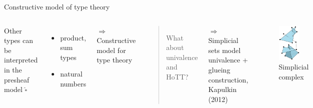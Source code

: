 \documentclass[english,draft]{beamer}
\begin{document}
\begin{frame}{Constructive model of type theory}
 


 \begin{columns}[c]
         Other types can be interpreted in the presheaf model $\widehat{\square}$
 
 \begin{itemize}
  \item product, sum types
  \item natural numbers
 \end{itemize}
        
         $\Rightarrow$ Constructive model for type theory
 
        \begin{quotation}
        What about univalence and HoTT?
        \end{quotation}
        
        \pause
        
        $\Rightarrow$ Simplicial sets model univalence + glueing construction, Kapulkin (2012)
        \begin{figure}
       \includegraphics[width=0.7\textwidth]{figures/simplex}
       \caption{Simplicial complex}
       \end{figure}
\end{columns}
 
\end{frame}
\end{document}
